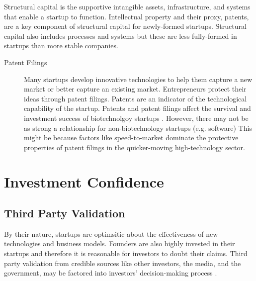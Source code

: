 Structural capital is the supportive intangible assets, infrastructure, and systems that enable a startup to function. Intellectual property and their proxy, patents, are a key component of structural capital for newly-formed startups. Structural capital also includes processes and systems but these are less fully-formed in startups than more stable companies.

\begin{description}

\item[Patent Filings]

Many startups develop innovative technologies to help them capture a new market or better capture an existing market. Entrepreneurs protect their ideas through patent filings. Patents are an indicator of the technological capability of the startup. Patents and patent filings affect the survival and investment success of biotechnolgoy startups \cite{baum2004,hoenen2014}. However, there may not be as strong a relationship for non-biotechnology startups (e.g. software) \cite{gimmon2010,ahlers2015} This might be because factors like speed-to-market dominate the protective properties of patent filings in the quicker-moving high-technology sector.

\end{description}

\section{Investment Confidence}

\subsection{Third Party Validation}

By their nature, startups are optimsitic about the effectiveness of new technologies and business models. Founders are also highly invested in their startups and therefore it is reasonable for investors to doubt their claims. Third party validation from credible sources like other investors, the media, and the government, may be factored into investors' decision-making process \cite{hsu2008,hochberg2007}.

